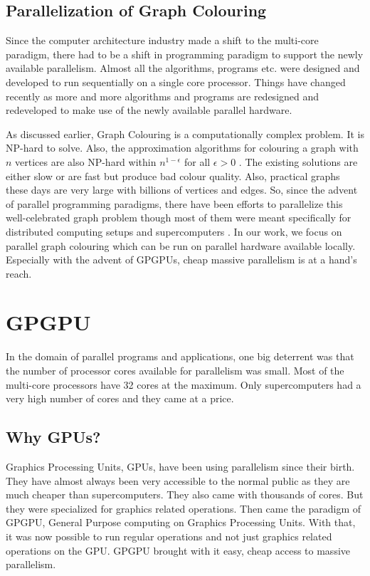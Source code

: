 \documentclass[MTech]{iitmdiss}
\begin{document}
\subsection{Parallelization of Graph Colouring}
Since the computer architecture industry made a shift to the multi-core paradigm, there had to be a shift in programming paradigm to support the newly available parallelism. Almost all the algorithms, programs etc. were designed and developed to run sequentially on a single core processor. Things have changed recently as more and more algorithms and programs are redesigned and redeveloped to make use of the newly available parallel hardware.

As discussed earlier, Graph Colouring is a computationally complex problem. It is NP-hard to solve. Also, the approximation algorithms for colouring a graph with $n$ vertices are also NP-hard within $n^{1-\epsilon}$ for all $\epsilon > 0$ \citep{Zuckerman:2006:LDE:1132516.1132612}. The existing solutions are either slow or are fast but produce bad colour quality. Also, practical graphs these days are very large with billions of vertices and edges. So, since the advent of parallel programming paradigms, there have been efforts to parallelize this well-celebrated graph problem though most of them were meant specifically for distributed computing setups \citep{journals/jpdc/BozdagGMBC08, DBLP:conf/hpcc/BozdagCGMBO05} and supercomputers \citep{CAtalyuRek:2012:GCA:2396901.2397093}. In our work, we focus on parallel graph colouring which can be run on parallel hardware available locally. Especially with the advent of GPGPUs, cheap massive parallelism is at a hand's reach.
\section{GPGPU}
In the domain of parallel programs and applications, one big deterrent was that the number of processor cores available for parallelism was small. Most of the multi-core processors have 32 cores at the maximum. Only supercomputers had a very high number of cores and they came at a price. 
\subsection{Why GPUs?}
Graphics Processing Units, GPUs, have been using parallelism since their birth. They have almost always been very accessible to the normal public as they are much cheaper than supercomputers. They also came with thousands of cores. But they were specialized for graphics related operations. Then came the paradigm of GPGPU, General Purpose computing on Graphics Processing Units. With that, it was now possible to run regular operations and not just graphics related operations on the GPU. GPGPU brought with it easy, cheap access to massive parallelism.
\end{document}
